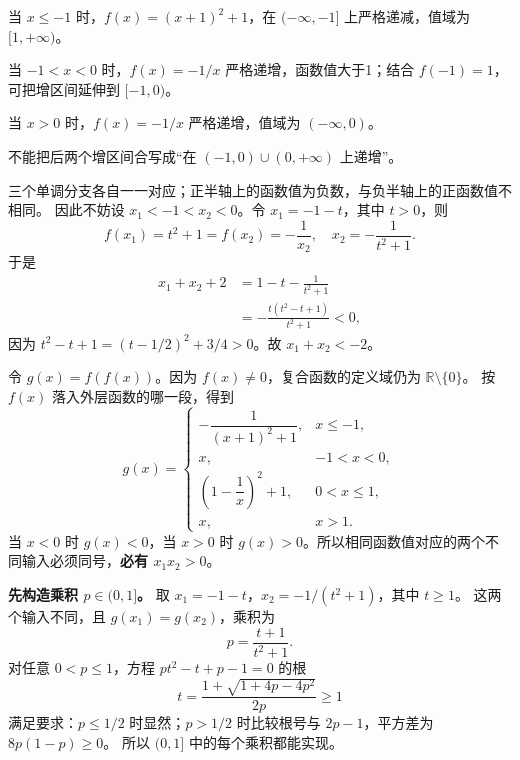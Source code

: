 \begin{frame}
当 $x\le-1$ 时，$f(x)=(x+1)^2+1$，在 $(-\infty,-1]$ 上严格递减，值域为 $[1,+\infty)$。
\par\vspace{3mm}
当 $-1<x<0$ 时，$f(x)=-1/x$ 严格递增，函数值大于1；结合 $f(-1)=1$，可把增区间延伸到 $[-1,0)$。
\par\vspace{3mm}
当 $x>0$ 时，$f(x)=-1/x$ 严格递增，值域为 $(-\infty,0)$。
\pause
\Answer{减区间：$(-\infty,-1]$；增区间：$[-1,0)$、$(0,+\infty)$。}
\par\vspace{2mm}
不能把后两个增区间合写成“在 $(-1,0)\cup(0,+\infty)$ 上递增”。
\end{frame}

\begin{frame}
三个单调分支各自一一对应；正半轴上的函数值为负数，与负半轴上的正函数值不相同。
因此不妨设 $x_1<-1<x_2<0$。令 $x_1=-1-t$，其中 $t>0$，则
\[f(x_1)=t^2+1=f(x_2)=-\frac1{x_2},\quad x_2=-\frac1{t^2+1}.\]
\pause
于是
\begin{align*}
x_1+x_2+2
&=1-t-\frac1{t^2+1}\\
&=-\frac{t(t^2-t+1)}{t^2+1}<0,
\end{align*}
因为 $t^2-t+1=(t-1/2)^2+3/4>0$。故 $\boxed{x_1+x_2<-2}$。
\end{frame}

\begin{frame}
令 $g(x)=f(f(x))$。因为 $f(x)\ne0$，复合函数的定义域仍为 $\mathbb R\setminus\{0\}$。
按 $f(x)$ 落入外层函数的哪一段，得到
\[g(x)=\begin{cases}
-\dfrac1{(x+1)^2+1},&x\le-1,\\[2mm]
x,&-1<x<0,\\[1mm]
\left(1-\dfrac1x\right)^2+1,&0<x\le1,\\[2mm]
x,&x>1.
\end{cases}\]
当 $x<0$ 时 $g(x)<0$，当 $x>0$ 时 $g(x)>0$。所以相同函数值对应的两个不同输入必须同号，\textbf{必有 $x_1x_2>0$}。
\end{frame}

\begin{frame}
\textbf{先构造乘积 $p\in(0,1]$。}
取 $x_1=-1-t$，$x_2=-1/(t^2+1)$，其中 $t\ge1$。
这两个输入不同，且 $g(x_1)=g(x_2)$，乘积为
\[p=\frac{t+1}{t^2+1}.\]
对任意 $0<p\le1$，方程 $pt^2-t+p-1=0$ 的根
\[t=\frac{1+\sqrt{1+4p-4p^2}}{2p}\ge1\]
满足要求：$p\le1/2$ 时显然；$p>1/2$ 时比较根号与 $2p-1$，平方差为 $8p(1-p)\ge0$。
所以 $(0,1]$ 中的每个乘积都能实现。
\end{frame}

